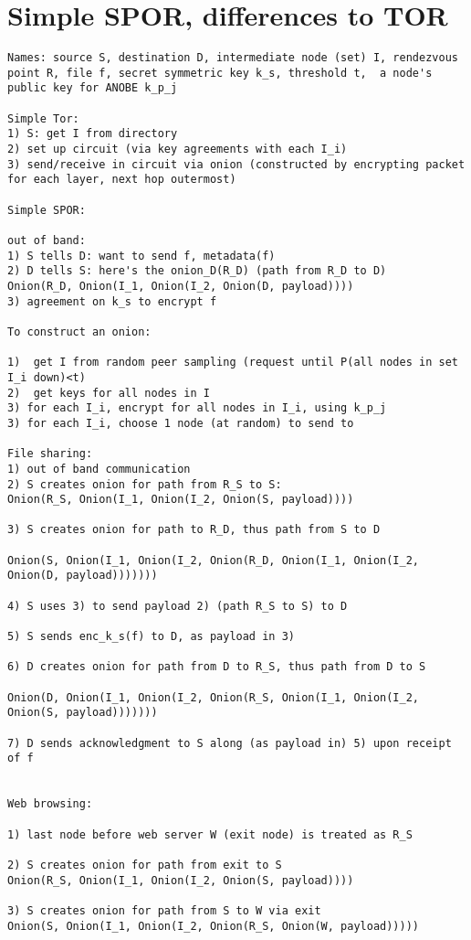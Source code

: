\onecolumn
\section{Simple SPOR, differences to TOR}
\begin{verbatim}
Names: source S, destination D, intermediate node (set) I, rendezvous point R, file f, secret symmetric key k_s, threshold t,  a node's public key for ANOBE k_p_j

Simple Tor:
1) S: get I from directory
2) set up circuit (via key agreements with each I_i)
3) send/receive in circuit via onion (constructed by encrypting packet for each layer, next hop outermost)

Simple SPOR:

out of band:
1) S tells D: want to send f, metadata(f)
2) D tells S: here's the onion_D(R_D) (path from R_D to D)
Onion(R_D, Onion(I_1, Onion(I_2, Onion(D, payload))))
3) agreement on k_s to encrypt f

To construct an onion:

1)  get I from random peer sampling (request until P(all nodes in set I_i down)<t)
2)  get keys for all nodes in I
3) for each I_i, encrypt for all nodes in I_i, using k_p_j
3) for each I_i, choose 1 node (at random) to send to

File sharing:
1) out of band communication
2) S creates onion for path from R_S to S:
Onion(R_S, Onion(I_1, Onion(I_2, Onion(S, payload))))

3) S creates onion for path to R_D, thus path from S to D

Onion(S, Onion(I_1, Onion(I_2, Onion(R_D, Onion(I_1, Onion(I_2, Onion(D, payload)))))))

4) S uses 3) to send payload 2) (path R_S to S) to D 

5) S sends enc_k_s(f) to D, as payload in 3)

6) D creates onion for path from D to R_S, thus path from D to S

Onion(D, Onion(I_1, Onion(I_2, Onion(R_S, Onion(I_1, Onion(I_2, Onion(S, payload)))))))

7) D sends acknowledgment to S along (as payload in) 5) upon receipt of f


Web browsing:

1) last node before web server W (exit node) is treated as R_S

2) S creates onion for path from exit to S
Onion(R_S, Onion(I_1, Onion(I_2, Onion(S, payload))))

3) S creates onion for path from S to W via exit
Onion(S, Onion(I_1, Onion(I_2, Onion(R_S, Onion(W, payload)))))


\end{verbatim}
